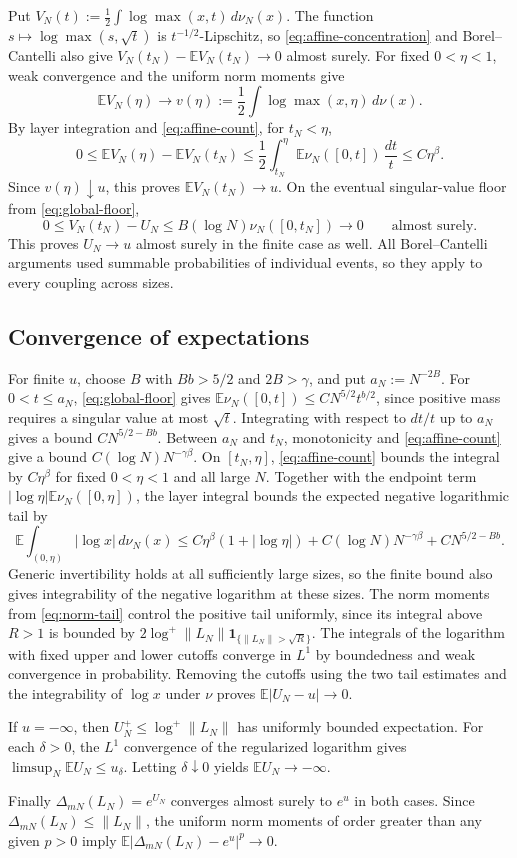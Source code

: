 Put $V_N(t):=\frac12\int\log\max(x,t)\,d\nu_N(x)$.
The function $s\mapsto\log\max(s,\sqrt t)$ is $t^{-1/2}$-Lipschitz, so \eqref{eq:affine-concentration} and Borel--Cantelli also give $V_N(t_N)-\mathbb E V_N(t_N)\to0$ almost surely.
For fixed $0<\eta<1$, weak convergence and the uniform norm moments give
\[
 \mathbb E V_N(\eta)\longrightarrow
 v(\eta):=\frac12\int\log\max(x,\eta)\,d\nu(x).
\]
By layer integration and \eqref{eq:affine-count}, for $t_N<\eta$,
\[
 0\le \mathbb E V_N(\eta)-\mathbb E V_N(t_N)
 \le \frac12\int_{t_N}^{\eta}\mathbb E\nu_N([0,t])\,\frac{dt}{t}
 \le C\eta^\beta.
\]
Since $v(\eta)\downarrow u$, this proves $\mathbb E V_N(t_N)\to u$.
On the eventual singular-value floor from \eqref{eq:global-floor},
\[
 0\le V_N(t_N)-U_N\le B(\log N)\nu_N([0,t_N])\longrightarrow 0
 \qquad\text{almost surely}.
\]
This proves $U_N\to u$ almost surely in the finite case as well.
All Borel--Cantelli arguments used summable probabilities of individual events, so they apply to every coupling across sizes.

\subsection{Convergence of expectations}\label{subsec:affine-mean}

For finite $u$, choose $B$ with $Bb>5/2$ and $2B>\gamma$, and put $a_N:=N^{-2B}$.
For $0<t\le a_N$, \eqref{eq:global-floor} gives $\mathbb E\nu_N([0,t])\le CN^{5/2}t^{b/2}$, since positive mass requires a singular value at most $\sqrt t$.
Integrating with respect to $dt/t$ up to $a_N$ gives a bound $CN^{5/2-Bb}$.
Between $a_N$ and $t_N$, monotonicity and \eqref{eq:affine-count} give a bound $C(\log N)N^{-\gamma\beta}$.
On $[t_N,\eta]$, \eqref{eq:affine-count} bounds the integral by $C\eta^\beta$ for fixed $0<\eta<1$ and all large $N$.
Together with the endpoint term $|\log\eta|\mathbb E\nu_N([0,\eta])$, the layer integral bounds the expected negative logarithmic tail by
\[
 \mathbb E\int_{(0,\eta)}|\log x|\,d\nu_N(x)
 \le C\eta^\beta(1+|\log\eta|)+C(\log N)N^{-\gamma\beta}+CN^{5/2-Bb}.
\]
Generic invertibility holds at all sufficiently large sizes, so the finite bound also gives integrability of the negative logarithm at these sizes.
The norm moments from \eqref{eq:norm-tail} control the positive tail uniformly, since its integral above $R>1$ is bounded by $2\log^+\|L_N\|\mathbf 1_{\{\|L_N\|>\sqrt R\}}$.
The integrals of the logarithm with fixed upper and lower cutoffs converge in $L^1$ by boundedness and weak convergence in probability.
Removing the cutoffs using the two tail estimates and the integrability of $\log x$ under $\nu$ proves $\mathbb E|U_N-u|\to0$.

If $u=-\infty$, then $U_N^+\le\log^+\|L_N\|$ has uniformly bounded expectation.
For each $\delta>0$, the $L^1$ convergence of the regularized logarithm gives $\limsup_N\mathbb E U_N\le u_\delta$.
Letting $\delta\downarrow0$ yields $\mathbb E U_N\to-\infty$.

Finally $\Delta_{mN}(L_N)=e^{U_N}$ converges almost surely to $e^u$ in both cases.
Since $\Delta_{mN}(L_N)\le\|L_N\|$, the uniform norm moments of order greater than any given $p>0$ imply $\mathbb E|\Delta_{mN}(L_N)-e^u|^p\to0$.
